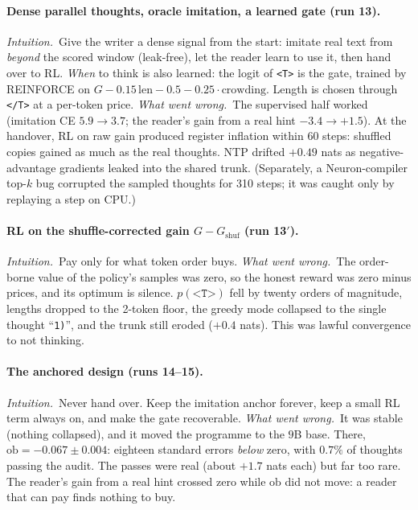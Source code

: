 \documentclass[11pt]{article}
\newcommand{\tstart}{\texttt{<T>}}
\newcommand{\tend}{\texttt{</T>}}
\newcommand{\why}{\emph{Intuition.}\ }
\newcommand{\fail}{\emph{What went wrong.}\ }
\begin{document}
\paragraph{Dense parallel thoughts, oracle imitation, a learned gate (run 13).}
\why Give the writer a dense signal from the start: imitate real text from \emph{beyond} the scored window (leak-free), let the reader learn to use it, then hand over to RL. \emph{When} to think is also learned: the logit of \tstart{} is the gate, trained by REINFORCE on $G-0.15\,\mathrm{len}-0.5-0.25\cdot\mathrm{crowding}$. Length is chosen through \tend{} at a per-token price.
\fail The supervised half worked (imitation CE $5.9\to3.7$; the reader's gain from a real hint $-3.4\to+1.5$). At the handover, RL on raw gain produced register inflation within 60 steps: shuffled copies gained as much as the real thoughts. NTP drifted $+0.49$ nats as negative-advantage gradients leaked into the shared trunk. (Separately, a Neuron-compiler top-$k$ bug corrupted the sampled thoughts for 310 steps; it was caught only by replaying a step on CPU.)

\paragraph{RL on the shuffle-corrected gain $G-G_{\mathrm{shuf}}$ (run 13$'$).}
\why Pay only for what token order buys.
\fail The order-borne value of the policy's samples was zero, so the honest reward was zero minus prices, and its optimum is silence. $p(\tstart)$ fell by twenty orders of magnitude, lengths dropped to the 2-token floor, the greedy mode collapsed to the single thought ``\texttt{1)}'', and the trunk still eroded ($+0.4$ nats). This was lawful convergence to not thinking.

\paragraph{The anchored design (runs 14--15).}
\why Never hand over. Keep the imitation anchor forever, keep a small RL term always on, and make the gate recoverable.
\fail It was stable (nothing collapsed), and it moved the programme to the $9$B base. There, $\mathrm{ob}=-0.067\pm0.004$: eighteen standard errors \emph{below} zero, with $0.7\%$ of thoughts passing the audit. The passes were real (about $+1.7$ nats each) but far too rare. The reader's gain from a real hint crossed zero while $\mathrm{ob}$ did not move: a reader that can pay finds nothing to buy.
\end{document}
